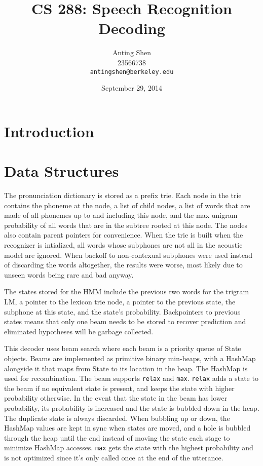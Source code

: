 \documentclass[11pt]{article}
\title{CS 288: Speech Recognition Decoding}
\author{Anting Shen \\
  23566738 \\
  {\tt antingshen@berkeley.edu} \\
}
\date{September 29, 2014}
\begin{document}
\maketitle

\section{Introduction}

\section{Data Structures}
The pronunciation dictionary is stored as a prefix trie. Each node in the trie contains the phoneme at the node, a list of child nodes, a list of words that are made of all phonemes up to and including this node, and the max unigram probability of all words that are in the subtree rooted at this node. The nodes also contain parent pointers for convenience. When the trie is built when the recognizer is intialized, all words whose subphones are not all in the acoustic model are ignored. When backoff to non-contexual subphones were used instead of discarding the words altogether, the results were worse, most likely due to unseen words being rare and bad anyway.

The states stored for the HMM include the previous two words for the trigram LM, a pointer to the lexicon trie node, a pointer to the previous state, the subphone at this state, and the state's probability. Backpointers to previous states means that only one beam needs to be stored to recover prediction and eliminated hypotheses will be garbage collected. 

This decoder uses beam search where each beam is a priority queue of State objects. Beams are implemented as primitive binary min-heaps, with a HashMap alongside it that maps from State to its location in the heap. The HashMap is used for recombination. The beam supports \texttt{relax} and \texttt{max}. \texttt{relax} adds a state to the beam if no equivalent state is present, and keeps the state with higher probability otherwise. In the event that the state in the beam has lower probability, its probability is increased and the state is bubbled down in the heap. The duplicate state is always discarded. When bubbling up or down, the HashMap values are kept in sync when states are moved, and a hole is bubbled through the heap until the end instead of moving the state each stage to minimize HashMap accesses. \texttt{max} gets the state with the highest probability and is not optimized since it's only called once at the end of the utterance. 
\end{document}
